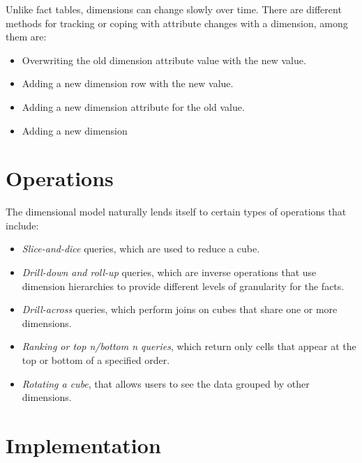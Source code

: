 \documentclass[]{article}
\begin{document}
Unlike fact tables, dimensions can change slowly over time. There are different methods for tracking or coping with attribute changes with a dimension, among them are:
\begin{itemize}
	\item Overwriting the old dimension attribute value with the new value.
	\item Adding a new dimension row with the new value.
	\item Adding a new dimension attribute for the old value.
	\item Adding a new dimension
\end{itemize}


\section{Operations} %
\label{sec:operations}
The dimensional model naturally lends itself to certain types of operations that include:

\begin{itemize}
	\item \emph{Slice-and-dice} queries, which are used to reduce a cube. 
	\item \emph{Drill-down and roll-up} queries, which are inverse operations that use dimension hierarchies to provide different levels of granularity for the facts.
	\item \emph{Drill-across} queries, which perform joins on cubes that share one or more dimensions. 
	\item \emph{Ranking or top n/bottom n queries}, which return only cells that appear at the top or bottom of a specified order.
	\item \emph{Rotating a cube}, that allows users to see the data grouped by other dimensions.
\end{itemize}



\section{Implementation} %
\label{sec:implementation}
\end{document}
